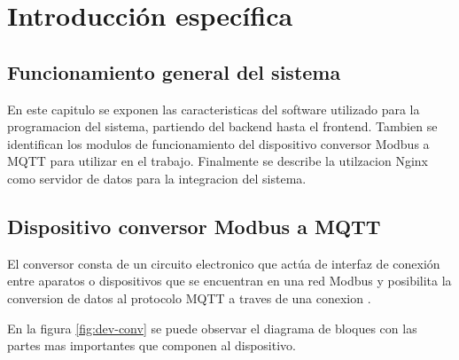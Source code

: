 \chapter{Introducción específica} %

\label{Chapter2}

\section{Funcionamiento general del sistema}

En este capitulo se exponen las caracteristicas del software utilizado para la programacion del sistema, partiendo del backend hasta el frontend. Tambien se identifican los modulos de funcionamiento del dispositivo conversor Modbus a MQTT para utilizar en el trabajo.  Finalmente se describe la utilzacion Nginx como servidor de datos para la integracion del sistema. 



\section{Dispositivo conversor Modbus a MQTT}

El conversor consta de un circuito electronico que actúa de interfaz de conexión entre aparatos o dispositivos que se encuentran en una red Modbus y posibilita la conversion de datos al protocolo MQTT a traves de una conexion .

En la figura \ref{fig:dev-conv} se puede observar el diagrama de bloques con las partes mas importantes que componen al dispositivo. 

